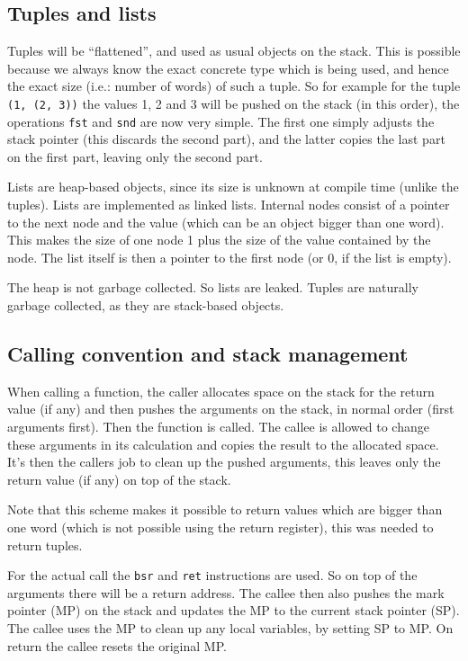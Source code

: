 \documentclass[14pt]{amsart}
\begin{document}
\subsection{Tuples and lists}
Tuples will be ``flattened'', and used as usual objects on the stack. This is possible because we always know the exact concrete type which is being used, and hence the exact size (i.e.: number of words) of such a tuple. So for example for the tuple \texttt{(1, (2, 3))} the values 1, 2 and 3 will be pushed on the stack (in this order), the operations \texttt{fst} and \texttt{snd} are now very simple. The first one simply adjusts the stack pointer (this discards the second part), and the latter copies the last part on the first part, leaving only the second part.

Lists are heap-based objects, since its size is unknown at compile time (unlike the tuples). Lists are implemented as linked lists. Internal nodes consist of a pointer to the next node and the value (which can be an object bigger than one word). This makes the size of one node 1 plus the size of the value contained by the node. The list itself is then a pointer to the first node (or 0, if the list is empty).

The heap is not garbage collected. So lists are leaked. Tuples are naturally garbage collected, as they are stack-based objects.

\subsection{Calling convention and stack management}
When calling a function, the caller allocates space on the stack for the return value (if any) and then pushes the arguments on the stack, in normal order (first arguments first). Then the function is called. The callee is allowed to change these arguments in its calculation and copies the result to the allocated space. It's then the callers job to clean up the pushed arguments, this leaves only the return value (if any) on top of the stack.

Note that this scheme makes it possible to return values which are bigger than one word (which is not possible using the return register), this was needed to return tuples.

For the actual call the \texttt{bsr} and \texttt{ret} instructions are used. So on top of the arguments there will be a return address. The callee then also pushes the mark pointer (MP) on the stack and updates the MP to the current stack pointer (SP). The callee uses the MP to clean up any local variables, by setting SP to MP. On return the callee resets the original MP.
\end{document}
